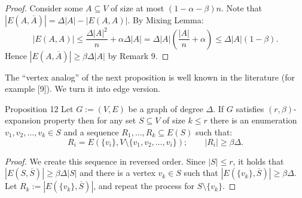 \begin{proof}
Consider some $A\subseteq V$ of size at most $(1-\alpha-\beta)n$. Note that $|E(A,\overline A)|=\Delta|A|-|E(A,A)|$. By Mixing Lemma:
\[|E(A,A)|\le\frac{\Delta|A|^2}{n}+\alpha\Delta|A|=\Delta|A|\left(\frac{|A|}{n}+\alpha\right)\le\Delta|A|(1-\beta).\]
Hence $|E(A,\overline A)|\ge\beta\Delta|A|$ by Remark 9.
\end{proof}
The ``vertex analog'' of the next proposition is well known in the literature (for example [9]). We turn it into edge version.
\begin{result}{Proposition 12}
Let $G:=(V,E)$ be a graph of degree $\Delta$. If $G$ satisfies $(r,\beta)$-expansion property then for any set $S\subseteq V$ of size $k\le r$ there is an enumeration $v_1,v_2,\ldots,v_k\in S$ and a sequence $R_1,\ldots,R_k\subseteq E(S)$ such that:
\[R_i=E(\{v_i\},V\setminus\{v_1,v_2,\ldots,v_i\});\qquad |R_i|\ge\beta\Delta.\]
\end{result}
\begin{proof}
We create this sequence in reversed order. Since $|S|\le r$, it holds that $|E(S,\overline S)|\ge\beta\Delta|S|$ and there is a vertex $v_k\in S$ such that $|E(\{v_k\},\overline S)|\ge\beta\Delta$. Let $R_k:=|E(\{v_k\},\overline S)|$, and repeat the process for $S\setminus\{v_k\}$.
\end{proof}
